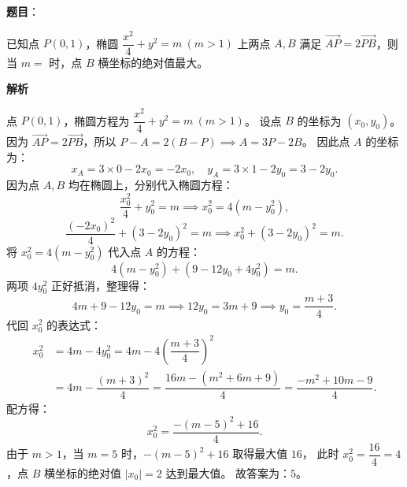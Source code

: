 \begin{answer}

\textbf{题目}：

已知点 $P(0, 1)$，椭圆 $\dfrac{x^2}{4} + y^2 = m\ (m > 1)$ 上两点 $A, B$ 满足 $\overrightarrow{AP} = 2\overrightarrow{PB}$，则当 $m =$ \underline{\hspace{2cm}} 时，点 $B$ 横坐标的绝对值最大。

\textbf{解析}

点 $P(0, 1)$，椭圆方程为 $\dfrac{x^2}{4} + y^2 = m\ (m > 1)$。
设点 $B$ 的坐标为 $(x_0, y_0)$。
因为 $\overrightarrow{AP} = 2\overrightarrow{PB}$，所以 $P - A = 2(B - P) \implies A = 3P - 2B$。
因此点 $A$ 的坐标为：
\nopagebreak[4]
\[x_A = 3 \times 0 - 2x_0 = -2x_0,\quad y_A = 3 \times 1 - 2y_0 = 3 - 2y_0.\]
因为点 $A, B$ 均在椭圆上，分别代入椭圆方程：
\nopagebreak[4]
\[\dfrac{x_0^2}{4} + y_0^2 = m \implies x_0^2 = 4(m - y_0^2),\]
\nopagebreak[4]
\[\dfrac{(-2x_0)^2}{4} + (3 - 2y_0)^2 = m \implies x_0^2 + (3 - 2y_0)^2 = m.\]
将 $x_0^2 = 4(m - y_0^2)$ 代入点 $A$ 的方程：
\nopagebreak[4]
\[4(m - y_0^2) + (9 - 12y_0 + 4y_0^2) = m.\]
两项 $4y_0^2$ 正好抵消，整理得：
\nopagebreak[4]
\[4m + 9 - 12y_0 = m \implies 12y_0 = 3m + 9 \implies y_0 = \dfrac{m + 3}{4}.\]
代回 $x_0^2$ 的表达式：
\nopagebreak[4]
\[\begin{aligned}
x_0^2 &= 4m - 4y_0^2 = 4m - 4\left(\dfrac{m + 3}{4}\right)^2 \\
&= 4m - \dfrac{(m + 3)^2}{4} = \dfrac{16m - (m^2 + 6m + 9)}{4} = \dfrac{-m^2 + 10m - 9}{4}.
\end{aligned}\]
配方得：
\nopagebreak[4]
\[x_0^2 = \dfrac{-(m - 5)^2 + 16}{4}.\]
由于 $m > 1$，当 $m = 5$ 时，$-(m - 5)^2 + 16$ 取得最大值 $16$，
此时 $x_0^2 = \dfrac{16}{4} = 4$，点 $B$ 横坐标的绝对值 $|x_0| = 2$ 达到最大值。
故答案为：$5$。


\par\medskip

\end{answer}

